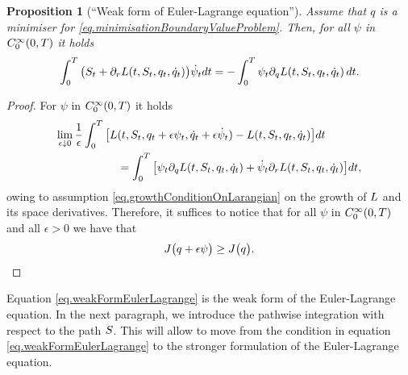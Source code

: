 \documentclass[10pt,a4paper]{article}
\newtheorem{prop}[thm]{Proposition}
\begin{document}
\begin{appendices}
\begin{prop}[``Weak form of Euler-Lagrange equation'']
	Assume that $q$ is a minimiser for \eqref{eq.minimisationBoundaryValueProblem}. Then, for all $\psi$ in $C^{\infty}_{0}(0,T)$ it holds 
	\begin{equation}
	\label{eq.weakFormEulerLagrange}
	\int_{0}^{T} \big( S_t + \partial_r L (t,S_t,q_t,\dot{q}_t) \big ) \dot{\psi}_t dt 
	= 
	- \int_{0}^{T} \psi_t \partial_q L (t,S_t,q_t,\dot{q}_t) \, dt .
	\end{equation}
\end{prop}
\begin{proof}
	For $\psi$ in $C^{\infty}_{0}(0,T)$ it holds 
	\begin{equation*}
	\begin{split}
	\lim_{\epsilon \downarrow 0} \frac{1}{\epsilon }\int_{0}^{T} \big[
		L &(t, S_t, q_t + \epsilon \psi_t, \dot{q}_t + \epsilon \dot{\psi}_t ) -  L (t,S_t,q_t, \dot{q}_t  )
	\big] dt \\
	& = \int_{0}^{T} \big[
		\psi_t \partial_q  L (t,S_t,q_t, \dot{q}_t  ) + \dot{\psi}_t \partial_r  L (t,S_t,q_t, \dot{q}_t  )
	\big] dt, 
	\end{split}
	\end{equation*}
	owing to assumption \eqref{eq.growthConditionOnLarangian} on the growth of $L$ and its space derivatives. Therefore, it suffices to notice that for all $\psi$ in $C^{\infty}_{0}(0,T)$ and all $\epsilon>0$ we have that 
	\begin{equation*}
	J \big( q+\epsilon\psi \big) \geq J \big( q\big).
	\end{equation*}
\end{proof}

Equation \eqref{eq.weakFormEulerLagrange} is the weak form of the Euler-Lagrange equation. In the next  paragraph, we introduce the pathwise integration with respect to the path $S$. This will allow to move from the condition in equation \eqref{eq.weakFormEulerLagrange} to the stronger formulation of the Euler-Lagrange equation. 


\end{appendices}
\end{document}
